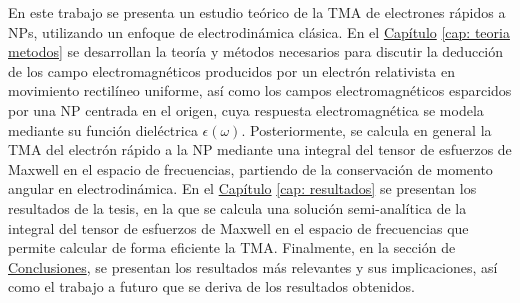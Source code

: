 En este trabajo se presenta un estudio teórico de la TMA de electrones rápidos a NPs, utilizando un enfoque de electrodinámica clásica. En el \hyperref[cap: teoria metodos]{Capítulo} \ref{cap: teoria metodos} se desarrollan la teoría y métodos necesarios para discutir la deducción de los campo electromagnéticos producidos por un electrón relativista en movimiento rectilíneo uniforme, así como los campos electromagnéticos esparcidos por una NP centrada en el origen, cuya respuesta electromagnética se modela mediante su función dieléctrica $\epsilon(\omega)$. Posteriormente, se calcula en general la TMA del electrón rápido a la NP mediante una integral del tensor de esfuerzos de Maxwell en el espacio de frecuencias, partiendo de la conservación de momento angular en electrodinámica. En el \hyperref[cap: resultados]{Capítulo} \ref{cap: resultados} se presentan los resultados de la tesis, en la que se calcula una solución semi-analítica de la integral del tensor de esfuerzos de Maxwell en el espacio de frecuencias que permite calcular de forma eficiente la TMA. Finalmente, en la sección de \hyperref[conclusiones]{Conclusiones}, se presentan los resultados más relevantes y sus implicaciones, así como el trabajo a futuro que se deriva de los resultados obtenidos.
